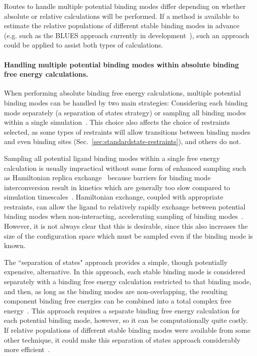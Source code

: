 \documentclass[9pt,bestpractices]{livecoms}
\begin{document}
Routes to handle multiple potential binding modes differ depending on whether absolute or relative calculations will be performed. If a method is available to estimate the relative populations of different stable binding modes in advance (e.g. such as the BLUES approach currently in development~\cite{gill2018binding}), such an approach could be applied to assist both types of calculations.

\paragraph{Handling multiple potential binding modes within absolute binding free energy calculations.}
When performing absolute binding free energy calculations, multiple potential binding modes can be handled by two main strategies: Considering each binding mode separately (a separation of states strategy) or sampling all binding modes within a single simulation~\cite{mobley2012perspective}.
This choice also affects the choice of restraints selected, as some types of restraints will allow transitions between binding modes and even binding sites (Sec.~\ref{sec:standardstate-restraints}), and others do not.

Sampling all potential ligand binding modes within a single free energy calculation is usually impractical without some form of enhanced sampling such as Hamiltonian replica exchange~\cite{wang2013identifying} because barriers for binding mode interconversion result in kinetics which are generally too slow compared to simulation timescales~\cite{mobley2006use, palma2012computation,mobley2012perspective, gill2018binding}.
Hamiltonian exchange, coupled with appropriate restraints, can allow the ligand to relatively rapidly exchange between potential binding modes when non-interacting, accelerating sampling of binding modes~\cite{wang2013identifying}. However, it is not always clear that this is desirable, since this also increases the size of the configuration space which must be sampled even if the binding mode is known.

The ``separation of states" approach provides a simple, though potentially expensive, alternative.  In this approach, each stable binding mode is considered separately with a binding free energy calculation restricted to that binding mode, and then, as long as the binding modes are non-overlapping, the resulting component binding free energies can be combined into a total complex free energy~\cite{mobley2006use, mobley2012perspective}.
This approach requires a separate binding free energy calculation for each potential binding mode, however, so it can be computationally quite costly.
If relative populations of different stable binding modes were available from some other technique, it could make this separation of states approach considerably more efficient~\cite{mobley2012perspective, gill2018binding}.
\end{document}

